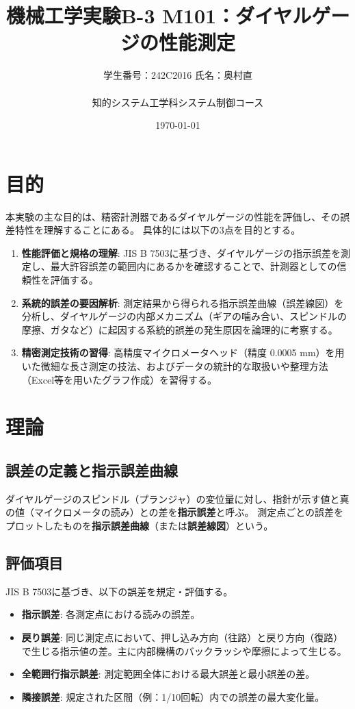 \documentclass[10pt,a4paper,titlepage]{jreport} %
\title{機械工学実験B-3 M101：ダイヤルゲージの性能測定} %
\author{
  学生番号：242C2016  氏名：奥村直 \\
  \\
  知的システム工学科システム制御コース
  } %
\date{\today} %
\begin{document}
\maketitle

\chapter{目的}
本実験の主な目的は、精密計測器であるダイヤルゲージの性能を評価し、その誤差特性を理解することにある。
具体的には以下の3点を目的とする。
\begin{enumerate}
    \item \textbf{性能評価と規格の理解}: JIS B 7503に基づき、ダイヤルゲージの指示誤差を測定し、最大許容誤差の範囲内にあるかを確認することで、計測器としての信頼性を評価する。
    \item \textbf{系統的誤差の要因解析}: 測定結果から得られる指示誤差曲線（誤差線図）を分析し、ダイヤルゲージの内部メカニズム（ギアの噛み合い、スピンドルの摩擦、ガタなど）に起因する系統的誤差の発生原因を論理的に考察する。
    \item \textbf{精密測定技術の習得}: 高精度マイクロメータヘッド（精度 0.0005 mm）を用いた微細な長さ測定の技法、およびデータの統計的な取扱いや整理方法（Excel等を用いたグラフ作成）を習得する。
\end{enumerate}

\chapter{理論}
\section{誤差の定義と指示誤差曲線}
ダイヤルゲージのスピンドル（プランジャ）の変位量に対し、指針が示す値と真の値（マイクロメータの読み）との差を\textbf{指示誤差}と呼ぶ。
測定点ごとの誤差をプロットしたものを\textbf{指示誤差曲線}（または\textbf{誤差線図}）という。

\section{評価項目}
JIS B 7503に基づき、以下の誤差を規定・評価する。
\begin{itemize}
    \item \textbf{指示誤差}: 各測定点における読みの誤差。
    \item \textbf{戻り誤差}: 同じ測定点において、押し込み方向（往路）と戻り方向（復路）で生じる指示値の差。主に内部機構のバックラッシや摩擦によって生じる。
    \item \textbf{全範囲行指示誤差}: 測定範囲全体における最大誤差と最小誤差の差。
    \item \textbf{隣接誤差}: 規定された区間（例：1/10回転）内での誤差の最大変化量。
\end{itemize}
\end{document}
